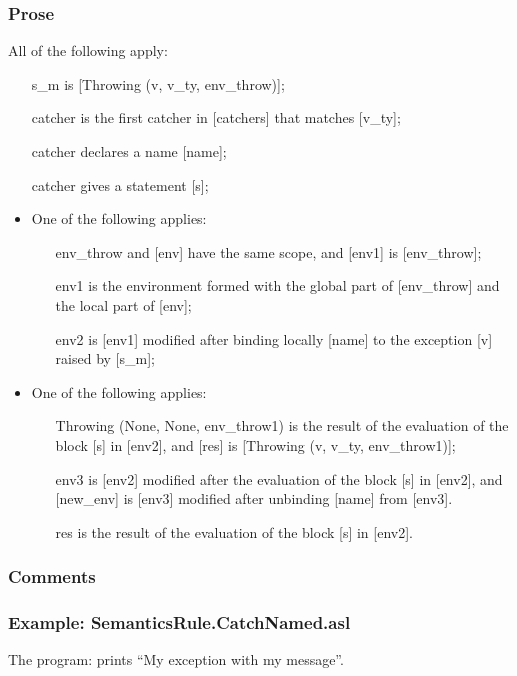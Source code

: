 \documentclass{book}
\begin{document}
    \subsubsection{Prose}
    All of the following apply:
    \begin{itemize}
    \item [s\_m] is [Throwing (v, v\_ty, env\_throw)];
    \item [catcher] is the first catcher in [catchers] that matches [v\_ty];
    \item [catcher] declares a name [name];
    \item [catcher] gives a statement [s];
    \item One of the following applies:
      \begin{itemize}
      \item [env\_throw] and [env] have the same scope, and [env1] is [env\_throw];
      \item [env1] is the environment formed with the global part of [env\_throw]
        and the local part of [env];
      \item [env2] is [env1] modified after binding locally [name] to the exception
        [v] raised by [s\_m];
      \end{itemize}
    \item One of the following applies:
      \begin{itemize}
      \item [Throwing (None, None, env\_throw1)] is the result of the evaluation of
        the block [s] in [env2], and [res] is [Throwing (v, v\_ty, env\_throw1)];
      \item [env3] is [env2] modified after the evaluation of the block [s] in
        [env2], and [new\_env] is [env3] modified after unbinding [name] from
        [env3].
      \item [res] is the result of the evaluation of the block [s] in [env2].
      \end{itemize}
    \end{itemize}

    \subsubsection{Comments}

    \subsubsection{Example: SemanticsRule.CatchNamed.asl}
    The program:
    prints ``My exception with my message''.
\end{document}
